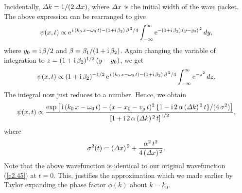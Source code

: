 Incidentally, ${\mit\Delta k}=1/(2\,{\mit\Delta}x)$, where ${\mit\Delta}x$ is the
initial width of the wave packet.
The above expression can be rearranged to give
\begin{equation}\label{e2.69}
\psi(x,t)\propto {\rm e}^{\,{\rm i}\,(k_0\,x-\omega_0\,t)-(1+{\rm i}\,\beta_2)\,\beta^{\,2}/4}\int_{-\infty}^\infty
{\rm e}^{-(1+{\rm i}\,\beta_2)\,(y-y_0)^{\,2}}\,dy,
\end{equation}
where $y_0={\rm i}\,\beta/2$ and $\beta=\beta_1/(1+{\rm i}\,\beta_2)$. 
Again changing the variable of integration to $z=(1+{\rm i}\,\beta_2)^{1/2}\,(y-y_0)$, we get
\begin{equation}
\psi(x,t)\propto (1+{\rm i}\,\beta_2)^{-1/2}\,{\rm e}^{\,{\rm i}\,(k_0\,x-\omega_0\,t)-(1+{\rm i}\,\beta_2)\,\beta^{\,2}/4}\int_{-\infty}^\infty
{\rm e}^{-z^2}\,dz.
\end{equation}
The integral now just reduces to a number. Hence, we obtain
\begin{equation}\label{exxx}
\psi(x,t)\propto\frac{\exp\left[\,{\rm i}\,(k_0\,x-\omega_0\,t) - (x-x_0-v_g\,t)^2\,\{1-{\rm i}\,2\,\alpha\,({\mit\Delta}k)^{\,2}\,t\}/(4\,\sigma^2)\right]}{\left[1+{\rm i}\,2\,\alpha\,({\mit\Delta}k)^{\,2}\,t\right]^{1/2}},
\end{equation}
where
\begin{equation}\label{e2.70}
\sigma^2(t) = ({\mit\Delta}x)^{\,2} + \frac{\alpha^2\,t^2}{4\,({\mit\Delta}x)^{\,2}}.
\end{equation}
Note that the above wavefunction is identical to our original wavefunction (\ref{e2.45}) at $t=0$. This, justifies the approximation which we made
earlier by Taylor expanding  the phase factor $\phi(k)$ about $k=k_0$. 

